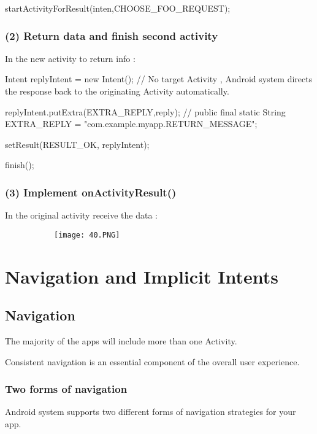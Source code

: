 \documentclass{article}
\begin{document}
startActivityForResult(inten,CHOOSE\_FOO\_REQUEST);

\subsubsection{(2) Return data and finish second activity}

In the new activity to return info : 

Intent replyIntent = new Intent(); // No target Activity , Android system directs the response back to the originating Activity automatically.

replyIntent.putExtra(EXTRA\_REPLY,reply); // public final static String EXTRA\_REPLY = "com.example.myapp.RETURN\_MESSAGE";

setResult(RESULT\_OK, replyIntent);

finish();


\subsubsection{(3) Implement onActivityResult()}

In the original activity receive the data :


\begin{figure}[ht!]
  \centering
  \begin{subfigure}[b]{0.8\linewidth}
    \texttt{[image: 40.PNG]}
  \end{subfigure}
  \end{figure}

\section{Navigation and Implicit Intents}

\subsection{Navigation}

The majority of the apps will include more than one Activity.

Consistent navigation is an essential component of the overall user experience.

\subsubsection{Two forms of navigation}

Android system supports two different forms of navigation strategies for your app.
\end{document}
